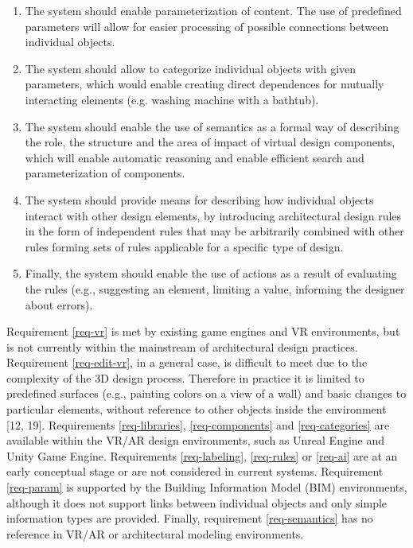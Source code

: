 \documentclass[runningheads]{llncs}
\begin{document}
\begin{enumerate}
\item	\label{req-param} The system should enable parameterization of content. The use of predefined parameters will allow for easier processing of possible connections between individual objects.\\

\item	\label{req-categories} The system should allow to categorize individual objects with given parameters, which would enable creating direct dependences for mutually interacting elements (e.g. washing machine with a bathtub).\\

\item	\label{req-semantics} The system should enable the use of semantics as a formal way of describing the role, the structure and the area of impact of virtual design components, which will enable automatic reasoning and enable efficient search and parameterization of components.\\

\item	\label{req-rules} The system should provide means for describing how individual objects interact with other design elements, by introducing architectural design rules in the form of independent rules that may be arbitrarily combined with other rules forming sets of rules applicable for a specific type of design.\\

\item 	\label{req-ai} Finally, the system should enable the use of actions as a result of evaluating the rules (e.g., suggesting an element, limiting a value, informing the designer about errors).\\
\end{enumerate}

Requirement \ref{req-vr} is met by existing game engines and VR environments, but is not currently within the mainstream of architectural design practices. Requirement \ref{req-edit-vr}, in a general case, is difficult to meet due to the complexity of the 3D design process. Therefore in practice it is limited to predefined surfaces (e.g., painting colors on a view of a wall) and basic changes to particular elements, without reference to other objects inside the environment [12, 19]. Requirements \ref{req-libraries}, \ref{req-components} and \ref{req-categories} are available within the VR/AR design environments, such as Unreal Engine and Unity  Game Engine. Requirements \ref{req-labeling}, \ref{req-rules} or \ref{req-ai} are at an early conceptual stage or are not considered in current systems. Requirement \ref{req-param} is supported by the Building Information Model (BIM) environments, although it does not support links between individual objects and only simple information types are provided. Finally, requirement \ref{req-semantics} has no reference in VR/AR or architectural modeling environments.
\end{document}
